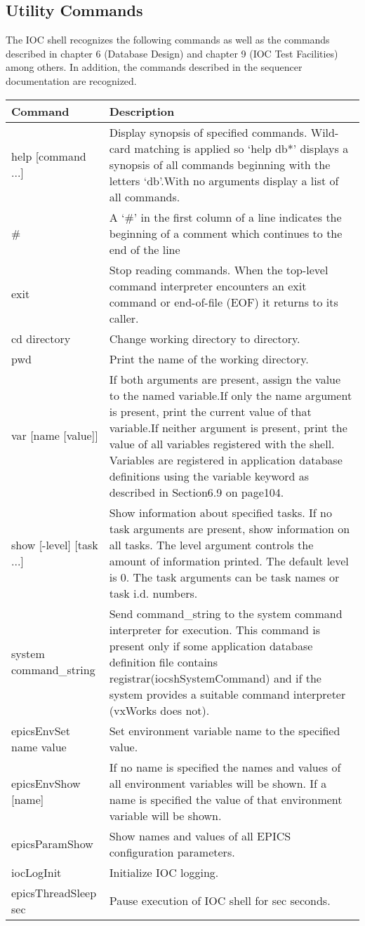 \subsection{Utility Commands}

The IOC shell recognizes the following commands as well as the commands described in chapter 6 (Database Design) and 
chapter 9 (IOC Test Facilities) among others.  In addition, the commands described in the sequencer documentation are 
recognized.
\begin{center}\begin{longtable}{p{1.59082in}p{5.21418in}}
Command & Description\\
\hline
help [command ...] & Display synopsis of specified commands.  Wild-card matching is applied so `help db*' displays a synopsis of all commands beginning with the letters `db'.With no arguments display a list of all commands.\\
\# & A `\#' in the first column of a line indicates the beginning of a comment which continues to the end of the line\\
exit & Stop reading commands. When the top-level command interpreter encounters an exit command or end-of-file (EOF) it returns to its caller.\\
cd directory & Change working directory to directory.\\
pwd & Print the name of the working directory.\\
var [name [value]] & If both arguments are present, assign the value to the named variable.If only the name argument is present, print the current value of that variable.If neither argument is present, print the value of all variables registered with the shell.  Variables are registered in application database definitions using the variable keyword as described in Section6.9 on page104.\\
show [-level] [task ...] & Show information about specified tasks.  If no task arguments are present, show information on all tasks.  The level argument controls the amount of information printed.  The default level is 0.  The task arguments can be task names or task i.d. numbers.\\
system command\_string & Send command\_string to the system command interpreter for execution.  This command is present only if some application database definition file contains registrar(iocshSystemCommand) and if the system provides a suitable command interpreter (vxWorks does not).\\
epicsEnvSet name value & Set environment variable name to the specified value.\\
epicsEnvShow  [name] & If no name is specified the names and values of all environment variables will be shown. If a name is specified the value of that environment variable will be shown.\\
epicsParamShow & Show names and values of all EPICS configuration parameters.\\
iocLogInit & Initialize IOC logging.\\
epicsThreadSleep sec & Pause execution of IOC shell for sec seconds.
\end{longtable}\end{center}


